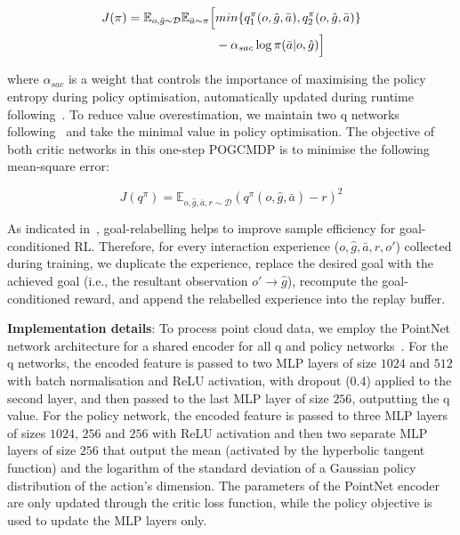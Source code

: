 \documentclass[letterpaper, 10 pt, journal, twoside]{ieeetran}
\begin{document}
\begin{equation*}
\begin{split}
J(\pi) = \mathbb{E}_{o, \hat{g}\sim\mathcal{D}}\mathbb{E}_{\bar{a}\sim\pi}\Bigl[&min\{q_1^{\pi}(o, \hat{g},\bar{a}), q_2^{\pi}(o, \hat{g},\bar{a})\}\\
&-\alpha_{sac}\log\pi(\bar{a}|o, \hat{g})\Bigr]
\end{split}
\end{equation*}

\noindent where $\alpha_{sac}$ is a weight that controls the importance of maximising the policy entropy during policy optimisation, automatically updated during runtime following~\cite{haarnoja2018soft}. To reduce value overestimation, we maintain two q networks following~\cite{fujimoto2018addressing} and take the minimal value in policy optimisation. The objective of both critic networks in this one-step POGCMDP is to minimise the following mean-square error:

$$
J(q^{\pi}) = \mathbb{E}_{o, \hat{g},\bar{a},r\sim\mathcal{D}}(q^{\pi}(o, \hat{g},\bar{a}) - r)^2
$$

As indicated in~\cite{andrychowicz2017hindsight}, goal-relabelling helps to improve sample efficiency for goal-conditioned RL. Therefore, for every interaction experience ($o, \hat{g}, \bar{a}, r, o'$) collected during training, we duplicate the experience, replace the desired goal with the achieved goal (i.e., the resultant observation $o'\rightarrow\hat{g}$), recompute the goal-conditioned reward, and append the relabelled experience into the replay buffer. 

\textbf{Implementation details}: To process point cloud data, we employ the PointNet network architecture for a shared encoder for all q and policy networks~\cite{qi2017pointnet}. For the q networks, the encoded feature is passed to two MLP layers of size $1024$ and $512$ with batch normalisation and ReLU activation, with dropout ($0.4$) applied to the second layer, and then passed to the last MLP layer of size $256$, outputting the q value. For the policy network, the encoded feature is passed to three MLP layers of sizes $1024$, $256$ and $256$ with ReLU activation and then two separate MLP layers of size $256$ that output the mean (activated by the hyperbolic tangent function) and the logarithm of the standard deviation of a Gaussian policy distribution of the action's dimension. The parameters of the PointNet encoder are only updated through the critic loss function, while the policy objective is used to update the MLP layers only.
\end{document}
